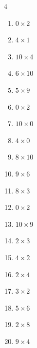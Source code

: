 \begin{multicols}{4}
\begin{enumerate}
  \item $0\times 2$
        \phantom{$=0$}

  \item $4\times 1$
        \phantom{$=4$}

  \item $10\times 4$
        \phantom{$=40$}

  \item $6\times 10$
        \phantom{$=60$}

  \item $5\times 9$
        \phantom{$=45$}

  \item $0\times 2$
        \phantom{$=0$}

  \item $10\times 0$
        \phantom{$=0$}

  \item $4\times 0$
        \phantom{$=0$}

  \item $8\times 10$
        \phantom{$=80$}

  \item $9\times 6$
        \phantom{$=54$}

\columnbreak %

\resetques

  \item $8\times 3$
        \phantom{$=24$}

  \item $0\times 2$
        \phantom{$=0$}

  \item $10\times 9$
        \phantom{$=90$}

  \item $2\times 3$
        \phantom{$=6$}

  \item $4\times 2$
        \phantom{$=8$}

  \item $2\times 4$
        \phantom{$=8$}

  \item $3\times 2$
        \phantom{$=6$}

  \item $5\times 6$
        \phantom{$=30$}

  \item $2\times 8$
        \phantom{$=16$}

  \item $9\times 4$
        \phantom{$=36$}


\end{enumerate}
\end{multicols}
